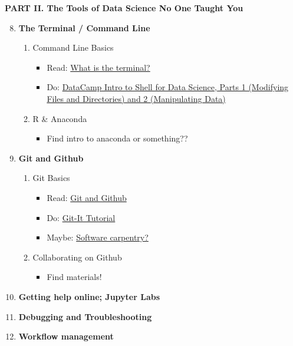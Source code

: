 \documentclass[12pt]{article}
\begin{document}
\vspace{.4in}
\begin{center}
	\textbf{PART II. The Tools of Data Science No One Taught You}
\end{center}
\vspace{.2in}

\begin{enumerate}[label=\textbf{Week \arabic*:}]
	\setcounter{enumi}{7}
	\item \textbf{The Terminal / Command Line}
	\begin{enumerate}[label=Class \arabic*:]
		\item Command Line Basics
		\begin{itemize}
			\item Read: \href{https://www.programming4ds.com/html/terminal.html}{What is the terminal?}
			\item Do: \href{https://campus.datacamp.com/courses/introduction-to-shell-for-data-science/}{DataCamp Intro to Shell for Data Science, Parts 1 (Modifying Files and Directories) and 2 (Manipulating Data)}
		\end{itemize}
		\item R \& Anaconda
		\begin{itemize}
			\item Find intro to anaconda or something??
		\end{itemize}
	\end{enumerate}

	\item \textbf{Git and Github}
	\begin{enumerate}[label=Class \arabic*:]
		\item Git Basics
		\begin{itemize}
			\item Read: \href{https://www.programming4ds.com/html/git_and_github.html}{Git and Github}
			\item Do: \href{http://jlord.us/git-it/}{Git-It Tutorial}
			\item Maybe: \href{http://swcarpentry.github.io/git-novice/03-create/index.html}{Software carpentry?}
		\end{itemize}
		\item Collaborating on Github
		\begin{itemize}
			\item Find materials!
		\end{itemize}
	\end{enumerate}
	\item \textbf{Getting help online; Jupyter Labs}
	\item \textbf{Debugging and Troubleshooting}
	\item \textbf{Workflow management}
\end{enumerate}
\end{document}
